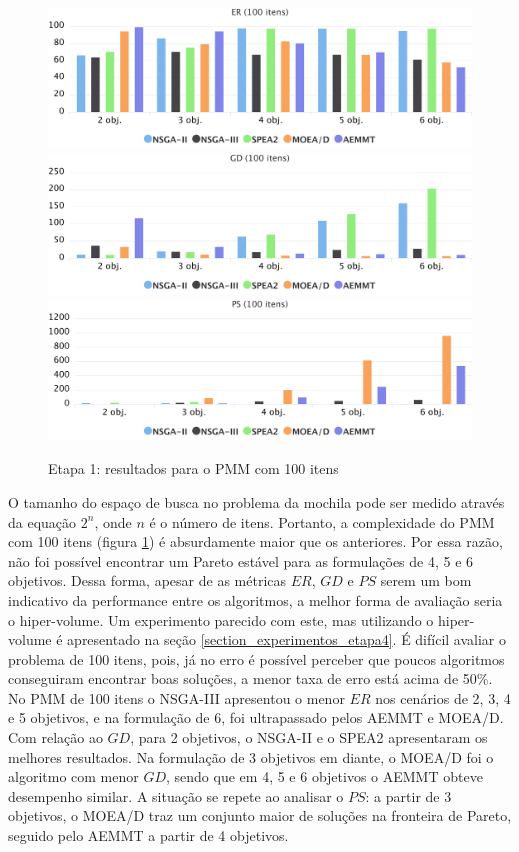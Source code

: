 \begin{figure}[!htbp]
	\caption{Etapa 1: resultados para o PMM com 100 itens}
	\label{fig_exp1_pmm_100}
	\includegraphics[width=1\textwidth]{cap_experimentos/figs/etapa1/er-mkp-100}
	\includegraphics[width=1\textwidth]{cap_experimentos/figs/etapa1/gd-mkp-100}
	\includegraphics[width=1\textwidth]{cap_experimentos/figs/etapa1/ps-mkp-100}
\end{figure}

O tamanho do espaço de busca no problema da mochila pode ser medido através da equação $2^n$, onde $n$ é o número de itens. Portanto, a complexidade do PMM com 100 itens (figura \ref{fig_exp1_pmm_100}) é absurdamente maior que os anteriores. Por essa razão, não foi possível encontrar um Pareto estável para as formulações de 4, 5 e 6 objetivos. Dessa forma, apesar de as métricas $ER$, $GD$ e $PS$ serem um bom indicativo da performance entre os algoritmos, a melhor forma de avaliação seria o hiper-volume. Um experimento parecido com este, mas utilizando o hiper-volume é apresentado na seção \ref{section_experimentos_etapa4}. É difícil avaliar o problema de 100 itens, pois, já no erro é possível perceber que poucos algoritmos conseguiram encontrar boas soluções, a menor taxa de erro está acima de 50\%. No PMM de 100 itens o NSGA-III apresentou o menor $ER$ nos cenários de 2, 3, 4 e 5 objetivos, e na formulação de 6, foi ultrapassado pelos AEMMT e MOEA/D. Com relação ao $GD$, para 2 objetivos, o NSGA-II e o SPEA2 apresentaram os melhores resultados. Na formulação de 3 objetivos em diante, o MOEA/D foi o algoritmo com menor $GD$, sendo que em 4, 5 e 6 objetivos o AEMMT obteve desempenho similar. A situação se repete ao analisar o $PS$: a partir de 3 objetivos, o MOEA/D traz um conjunto maior de soluções na fronteira de Pareto, seguido pelo AEMMT a partir de 4 objetivos.

